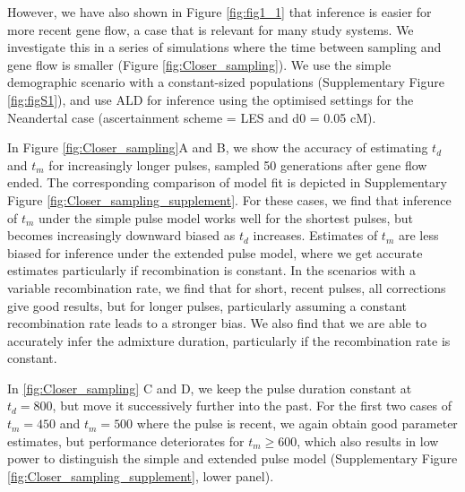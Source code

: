 \documentclass[11pt]{article}
\begin{document}
However, we have also shown in Figure  \ref{fig:fig1_1} that inference is easier for more recent gene flow, a case that is relevant for many study systems. We investigate this in a series of simulations where the time between sampling and gene flow is smaller (Figure \ref{fig:Closer_sampling}). We use the simple demographic scenario with a constant-sized populations (Supplementary Figure \ref{fig:figS1}), and use ALD for inference using the optimised settings for the Neandertal case (ascertainment scheme = LES and  d0 = 0.05 cM).

In Figure \ref{fig:Closer_sampling}A and B, we show the accuracy of estimating $t_d$ and $t_m$ for increasingly longer pulses, sampled 50 generations after gene flow ended. The corresponding comparison of model fit is depicted in Supplementary Figure \ref{fig:Closer_sampling_supplement}. For these cases, we find that inference of $t_m$ under the simple pulse model works well for the shortest pulses, but becomes increasingly downward biased as $t_d$ increases.  Estimates of $t_m$ are less biased for inference under the extended 
pulse model, where we get accurate estimates particularly if recombination is constant. In the scenarios with a variable recombination rate, we find that for short, recent pulses, all corrections give good results, but for longer pulses, particularly assuming a constant recombination rate leads to a stronger bias. We also find that we are able to accurately infer the admixture duration, particularly if the recombination rate is constant.

In \ref{fig:Closer_sampling} C and D, we keep the pulse duration constant at $t_d=800$, but move it successively further into the past. For the first two cases of $t_m=450$ and $t_m=500$ where the pulse is recent, we again obtain good parameter estimates, but performance deteriorates for $t_m \geq 600$, which also results in low power to distinguish the simple and extended pulse model (Supplementary Figure \ref{fig:Closer_sampling_supplement}, lower panel). 
\end{document}

